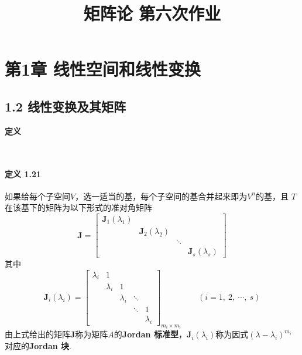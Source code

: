 \documentclass[12pt, a4paper, oneside, fontset=none]{ctexart}
\author{}
\date{}
\title{\vspace{-3em}\textbf{矩阵论 \quad 第六次作业}\vspace{-3em}}
\begin{document}
\maketitle

\section*{第1章 \quad 线性空间和线性变换}

\subsection*{1.2 \quad 线性变换及其矩阵}

\centerline{\large{\textbf{定义}}} \ \par

\paragraph*{定义 1.21} 如果给每个子空间$V$，选一适当的基，每个子空间的基合并起来即为$V^n$的基，且
$T$在该基下的矩阵为以下形式的准对角矩阵
\begin{equation*}
    \bm{J} = \begin{bmatrix}
        \bm{J}_1(\lambda_1) &                     &        &                     \\
                            & \bm{J}_2(\lambda_2) &        &                     \\
                            &                     & \ddots &                     \\
                            &                     &        & \bm{J}_s(\lambda_s)
    \end{bmatrix}
\end{equation*}
其中
\begin{equation*}
    \bm{J}_i(\lambda_i) = \begin{bmatrix}
        \lambda_i & 1         &           &        &           \\
                  & \lambda_i & 1         &        &           \\
                  &           & \lambda_i & \ddots &           \\
                  &           &           & \ddots & 1         \\
                  &           &           &        & \lambda_i
    \end{bmatrix}_{m_i\times m_i} \qquad (i = 1,\ 2,\ \cdots,\ s)
\end{equation*}
由上式给出的矩阵$\bm{J}$称为矩阵$A$的\textbf{Jordan 标准型}，$\bm{J}_i(\lambda_i)$称为因式$(\lambda-\lambda_i)^{m_i}$对应的\textbf{Jordan
    块}.
\par \ \par
\end{document}

